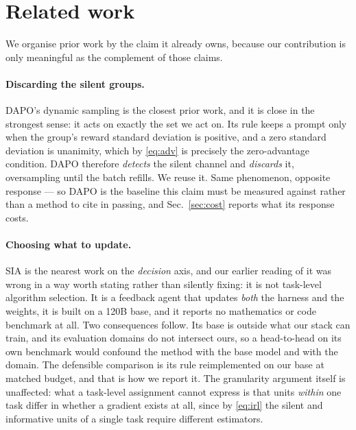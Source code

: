\section{Related work}
\label{sec:related}

We organise prior work by the claim it already owns, because our contribution is only
meaningful as the complement of those claims.

\paragraph{Discarding the silent groups.} DAPO's dynamic sampling is the closest prior
work, and it is close in the strongest sense: it acts on exactly the set we act on. Its rule
keeps a prompt only when the group's reward standard deviation is positive, and a zero
standard deviation is unanimity, which by \eqref{eq:adv} is precisely the zero-advantage
condition. DAPO therefore \emph{detects} the silent channel and \emph{discards} it,
oversampling until the batch refills. We reuse it. Same phenomenon, opposite response --- so
DAPO is the baseline this claim must be measured against rather than a method to cite in
passing, and Sec.~\ref{sec:cost} reports what its response costs.

\paragraph{Choosing what to update.} SIA is the nearest work on the \emph{decision} axis,
and our earlier reading of it was wrong in a way worth stating rather than silently fixing:
it is not task-level algorithm selection. It is a feedback agent that updates \emph{both} the
harness and the weights, it is built on a 120B base, and it reports no mathematics or code
benchmark at all. Two consequences follow. Its base is outside what our stack can train, and
its evaluation domains do not intersect ours, so a head-to-head on its own benchmark would
confound the method with the base model and with the domain. The defensible comparison is its
rule reimplemented on our base at matched budget, and that is how we report it. The
granularity argument itself is unaffected: what a task-level assignment cannot express is
that units \emph{within} one task differ in whether a gradient exists at all, since by
\eqref{eq:irl} the silent and informative units of a single task require different
estimators.

